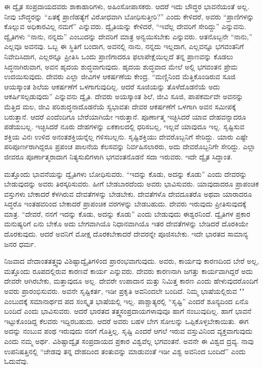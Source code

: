
ಈ ದ್ವೈತ ಸಂಪ್ರದಾಯದವರು ಶಾಕಾಹಾರಿಗಳು, ಅಹಿಂಸೋಪಾಸಕರು. ಆದರೆ ಇದು ಬೌದ್ಧರ ಭಾವನೆಯಂತೆ ಅಲ್ಲ. ನೀವು ಬೌದ್ಧರನ್ನು “ಏತಕ್ಕೆ ಪ್ರಾಣಿಹತ್ಯೆಗೆ ವಿರೋಧವಾಗಿ ಬೋಧಿಸುತ್ತೀರಿ?” ಎಂದು ಕೇಳಿದರೆ, ಅವರು “ಪ್ರಾಣಿಗಳನ್ನು ಕೊಲ್ಲುವ ಅಧಿಕಾರವಿಲ್ಲ ನಮಗೆ” ಎನ್ನುವರು. ದ್ವೈತಿಯನ್ನು ಕೇಳಿದರೆ, “ಇವೆಲ್ಲ ದೇವರಿಗೆ ಸೇರಿದ್ದು” ಎನ್ನುವನು. ದ್ವೈತಿಗಳು “ನಾನು, ನನ್ನದು” ಎಂಬುದನ್ನು ದೇವರಿಗೆ ಮಾತ್ರ ಅನ್ವಯಿಸಬೇಕು ಎನ್ನುವರು. ಆತನೊಬ್ಬನೇ “ನಾನು,” ಎಲ್ಲವೂ ಅವನವು. ಒಬ್ಬ ಈ ಸ್ಥಿತಿಗೆ ಬಂದಾಗ, ಅವನಲ್ಲಿ ನಾನು, ನನ್ನದು ಇಲ್ಲದಾಗ, ಎಲ್ಲವನ್ನೂ ಭಗವಂತನಿಗೆ ನಿವೇದಿಸಿದಾಗ, ಎಲ್ಲರನ್ನೂ ಪ್ರೀತಿಸಿ ಒಂದು ಪ್ರಾಣಿಗಾದರೂ ಫಲಾಪೇಕ್ಷೆಯಿಲ್ಲದೆ ತನ್ನ ಪ್ರಾಣವನ್ನು ಕೊಡಲು ಸಿದ್ಧನಾಗಿರುವಾಗ, ಅವನ ಹೃದಯ ಶುದ್ಧವಾಗುವುದು. ಹೃದಯ ಶುದ್ಧವಾದ ಮೇಲೆ ಅಲ್ಲಿ ಭಗವಂತನ ಪ್ರೇಮ ಉದಯಿಸುವುದು. ದೇವರು ಎಲ್ಲಾ ಜೀವಿಗಳ ಆಕರ್ಷಣೆಯ ಕೇಂದ್ರ. “ಮಣ್ಣಿನಿಂದ ಮೆತ್ತಿಕೊಂಡಿರುವ ಸೂಜಿ ಆಯಸ್ಕಾಂತ ಶಿಲೆಯ ಆಕರ್ಷಣೆಗೆ ಒಳಗಾಗುವುದಿಲ್ಲ. ಆದರೆ ಸೂಜಿಯನ್ನು ತೊಳೆದೊಡನೆಯೆ ಅದು ಆಕರ್ಷಿಸಲ್ಪಡುವುದು” ಎನ್ನುವನು ದ್ವೈತಿ. ದೇವರು ಅಯಸ್ಕಾಂತ ಶಿಲೆ, ಜೀವಿ ಸೂಜಿ, ಪಾಪಕರ್ಮವೇ ಅವನನ್ನು ಮೆತ್ತಿದ ಮಲ, ಜೀವಿ ಪರಿಶುದ್ಧನಾದೊಡನೆಯೆ ಸ್ವಭಾವತಃ ದೇವರ ಆಕರ್ಷಣೆಗೆ ಒಳಗಾಗಿ ಅವನ ಸಮೀಪಕ್ಕೆ ಬರುತ್ತಾನೆ. ಆದರೆ ಎಂದೆಂದಿಗೂ ಬೇರೆಯಾಗಿಯೇ ಇರುತ್ತಾನೆ. ಪೂರ್ಣಾತ್ಮ ಇಚ್ಛಿಸಿದರೆ ಯಾವ ದೇಹವನ್ನಾದರೂ ಪಡೆಯಬಲ್ಲ. ಇಚ್ಛಿಸಿದರೆ ನೂರು ದೇಹಗಳನ್ನು ಏಕಕಾಲದಲ್ಲಿ ಧರಿಸಬಲ್ಲ, ಇಲ್ಲವೆ ಯಾವುದೂ ಇಲ್ಲ. ಸೃಷ್ಟಿಸುವ ಶಕ್ತಿಯ ವಿನಃ ಉಳಿದ ಅನಂತಶಕ್ತಿಯನ್ನೆಲ್ಲ ಗಳಿಸಬಲ್ಲನು. ಸೃಷ್ಟಿಶಕ್ತಿಯು ದೇವರೊಬ್ಬನಿಗೆ ಸೇರಿದ್ದು. ಯಾರು ಎಷ್ಟೇ ಪರಿಪೂರ್ಣರಾಗಿದ್ದರೂ ಪ್ರಪಂಚ ಪಾಲನೆಯ ಕೆಲಸವನ್ನು ನಿರ್ವಹಿಸಲಾರರು, ಅದು ದೇವರೊಬ್ಬನಿಗೇ ಸೇರಿದ್ದು. ಎಲ್ಲಾ ಜೀವರೂ ಪೂರ್ಣಾತ್ಮರಾದಾಗ ನಿತ್ಯಸುಖಿಗಳಾಗಿ ಭಗವಂತನೊಡನೆ ಸದಾ ಇರುವರು. ಇದೇ ದ್ವೈತ ಸಿದ್ಧಾಂತ.

ಮತ್ತೊಂದು ಭಾವನೆಯನ್ನು ದ್ವೈತಿಗಳು ಬೋಧಿಸುವರು. “ಇದನ್ನು ಕೊಡು, ಅದನ್ನು ಕೊಡು” ಎಂದು ದೇವರನ್ನು ಬೇಡುವುದನ್ನು ಅವರು ತಿರಸ್ಕರಿಸುವರು. ಹೀಗೆ ಬೇಡಬಾರದೆಂದು ಅವರು ಭಾವಿಸುವರು. ಯಾವುದಾದರೂ ಪ್ರಾಪಂಚಿಕ ವಸ್ತುಗಳು ಬೇಕಾದರೆ ಕೆಳಗಿರುವ ದೇವತೆಗಳನ್ನು ಬೇಡಬೇಕು. ದೇವತೆಗಳೊ ದೇವದೂತರೊ ಅಥವಾ ಯಾರಾದರೂ ಸಿದ್ಧರೊ ಇಂತಹವರಿಂದ ಬೇಕಾದರೆ ಪ್ರಾಪಂಚಿಕ ವರಗಳನ್ನು ಬೇಡಬಹುದು. ದೇವರು ಇರುವುದು ಪ್ರೀತಿಸುವುದಕ್ಕೆ ಮಾತ್ರ. “ದೇವರೆ, ನನಗೆ ಇದನ್ನು ಕೊಡು, ಅದನ್ನು ಕೊಡು” ಎಂದು ಬೇಡುವುದು ಈಶ್ವರನಿಂದೆ. ದ್ವೈತಿಗಳ ಪ್ರಕಾರ ಮನುಷ್ಯರಿಗೆ ಏನು ಬೇಕೊ ಅದು ಬೇಗವಾಗಿಯೊ ನಿಧಾನವಾಗಿಯೊ ಇತರ ದೇವತೆಗಳನ್ನು ಬೇಡಿದರೆ ದೊರಕಿಯೇ ದೊರಕುವುದು. ಆದರೆ ಅವನಿಗೆ ಮೋಕ್ಷ ದೊರಕಬೇಕಾದರೆ ದೇವರನ್ನೇ ಪೂಜಿಸಬೇಕು. ಇದೇ ಭಾರತದ ಸಾಮಾನ್ಯ ಜನರ ಧರ್ಮ.


ನಿಜವಾದ ವೇದಾಂತತತ್ತ್ವವು ವಿಶಿಷ್ಟಾದ್ವೈತಿಗಳಿಂದ ಪ್ರಾರಂಭವಾಗುವುದು. ಅವರು, ಕಾರ್ಯವು ಕಾರಣದಿಂದ ಬೇರೆ ಅಲ್ಲ, ಮತ್ತೊಂದು ರೂಪದಲ್ಲಿರುವ ಕಾರಣವೆ ಕಾರ್ಯ ಎನ್ನುವರು. ದೇವರು ಕಾರಣನಾಗಿ ಜಗತ್ತು ಕಾರ್ಯವಾಗಿದ್ದರೆ ಅದು ದೇವರೇ ಆಗಿರಬೇಕು, ಮತ್ತಾವುದೂ ಅಲ್ಲ. ದೇವರೇ ಉಪಾದಾನ ಮತ್ತು ನಿಮಿತ್ತ ಕಾರಣ ಎಂದು ಹೇಳುವುದರೊಂದಿಗೆ ಅವರು ಪ್ರಾರಂಭಿಸುವರು. ಅವನೇ ಸೃಷ್ಟಿಕರ್ತ, ಇಡೀ ಪ್ರಕೃತಿ ಅವನಿಂದಲೇ ಬಂದಿದೆ. ನಿಮ್ಮ ಭಾಷೆಯಲ್ಲಿರುವ "" ಎಂಬುದಕ್ಕೆ ಸಮಾನಾರ್ಥದ ಪದ ಸಂಸ್ಕೃತ ಭಾಷೆಯಲ್ಲಿ ಇಲ್ಲ. ಪಾಶ್ಚಾತ್ಯರಲ್ಲಿ “ಸೃಷ್ಟಿ” ಎಂದರೆ ಶೂನ್ಯದಿಂದ ಏನೊ ಬಂದಿದೆ ಎಂದು ಭಾವಿಸುವರು. ಆದರೆ ಭಾರತದ ತತ್ತ್ವಸಂಪ್ರದಾಯಗಳಾವುವೂ ಹಾಗೆ ನಂಬುವುದಿಲ್ಲ. ಹಾಗೆ ಭಾವನೆ ಇಟ್ಟುಕೊಂಡಿದ್ದ ಕೆಲವರು ಇದ್ದಿರಬಹುದು. ಆದರೆ ಅವರು ಬಹಳ ಬೇಗ ಸೋಲನ್ನು ಒಪ್ಪಿಕೊಳ್ಳಬೇಕಾಯಿತು. ಈಗ ಅದನ್ನು ನಂಬುವ ಪಂಥ ಇರುವುದು ನನಗೆ ಗೊತ್ತಿಲ್ಲ. ಸೃಷ್ಟಿ ಎಂದರೆ ಆಗಲೆ ಇರುವ ವಸ್ತುವಿನಿಂದ ವ್ಯಕ್ತವಾಗುವುದು ಎಂದು ನಮ್ಮ ಅರ್ಥ. ವಿಶಿಷ್ಟಾದ್ವೈತ ಸಂಪ್ರದಾಯದ ಪ್ರಕಾರ ವಿಶ್ವವೆಲ್ಲ ಭಗವಂತನೆ. ಅವನೇ ಈ ವಿಶ್ವದ ದ್ರವ್ಯ. ನಾವು ಉಪನಿಷತ್ತಿನಲ್ಲಿ “ಜೇಡವು ತನ್ನ ದೇಹದಿಂದ ತಂತುವನ್ನು ಮಾಡುವಂತೆ ಇಡೀ ವಿಶ್ವ ಅವನಿಂದ ಬಂದಿದೆ” ಎಂದು ಓದುವೆವು.

